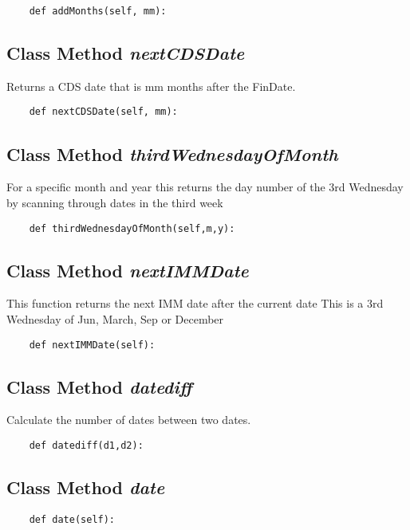 \documentclass[twoside,11pt]{book}
\begin{document}
\begin{lstlisting}
    def addMonths(self, mm):
\end{lstlisting}

\subsection{Class Method {\it nextCDSDate}}
Returns a CDS date that is mm months after the FinDate. 

\begin{lstlisting}
    def nextCDSDate(self, mm):
\end{lstlisting}

\subsection{Class Method {\it thirdWednesdayOfMonth}}
For a specific month and year this returns the day number of the 3rd Wednesday by scanning through dates in the third week 

\begin{lstlisting}
    def thirdWednesdayOfMonth(self,m,y):
\end{lstlisting}

\subsection{Class Method {\it nextIMMDate}}
This function returns the next IMM date after the current date This is a 3rd Wednesday of Jun, March, Sep or December 

\begin{lstlisting}
    def nextIMMDate(self):
\end{lstlisting}

\subsection{Class Method {\it datediff}}
Calculate the number of dates between two dates. 

\begin{lstlisting}
    def datediff(d1,d2):
\end{lstlisting}

\subsection{Class Method {\it date}}


\begin{lstlisting}
    def date(self):
\end{lstlisting}
\end{document}
